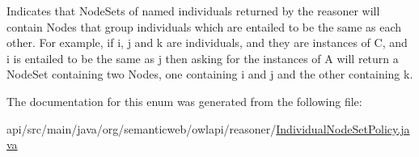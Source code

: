 Indicates that {\ttfamily Node\-Set}s of named individuals returned by the reasoner will contain {\ttfamily Node}s that group individuals which are entailed to be the same as each other. For example, if {\ttfamily i}, {\ttfamily j} and {\ttfamily k} are individuals, and they are instances of {\ttfamily C}, and {\ttfamily i} is entailed to be the same as {\ttfamily j} then asking for the instances of {\ttfamily A} will return a {\ttfamily Node\-Set} containing two {\ttfamily Node}s, one containing {\ttfamily i} and {\ttfamily j} and the other containing {\ttfamily k}. 

The documentation for this enum was generated from the following file\-:\begin{DoxyCompactItemize}
\item 
api/src/main/java/org/semanticweb/owlapi/reasoner/\hyperlink{_individual_node_set_policy_8java}{Individual\-Node\-Set\-Policy.\-java}\end{DoxyCompactItemize}
